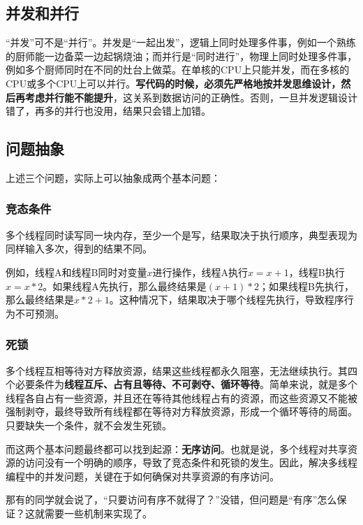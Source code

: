 \subsection{并发和并行}

“并发”可不是“并行”。并发是“一起出发”，逻辑上同时处理多件事，例如一个熟练的厨师能一边备菜一边起锅烧油；而并行是“同时进行”，物理上同时处理多件事，例如多个厨师同时在不同的灶台上做菜。在单核的CPU上只能并发，而在多核的CPU或多个CPU上可以并行。\textbf{写代码的时候，必须先严格地按并发思维设计，然后再考虑并行能不能提升}，这关系到数据访问的正确性。否则，一旦并发逻辑设计错了，再多的并行也没用，结果只会错上加错。

\subsection{问题抽象}

上述三个问题，实际上可以抽象成两个基本问题：

\subsubsection{竞态条件}

多个线程同时读写同一块内存，至少一个是写，结果取决于执行顺序，典型表现为同样输入多次，得到的结果不同。

例如，线程A和线程B同时对变量$x$进行操作，线程A执行$x = x + 1$，线程B执行$x = x * 2$。如果线程A先执行，那么最终结果是$(x + 1) * 2$；如果线程B先执行，那么最终结果是$x * 2 + 1$。这种情况下，结果取决于哪个线程先执行，导致程序行为不可预测。

\subsubsection{死锁}

多个线程互相等待对方释放资源，结果这些线程都永久阻塞，无法继续执行。其四个必要条件为\textbf{线程互斥、占有且等待、不可剥夺、循环等待}。简单来说，就是多个线程各自占有一些资源，并且还在等待其他线程占有的资源，而这些资源又不能被强制剥夺，最终导致所有线程都在等待对方释放资源，形成一个循环等待的局面。只要缺失一个条件，就不会发生死锁。

而这两个基本问题最终都可以找到起源：\textbf{无序访问}。也就是说，多个线程对共享资源的访问没有一个明确的顺序，导致了竞态条件和死锁的发生。因此，解决多线程编程中的并发问题，关键在于如何确保对共享资源的有序访问。

那有的同学就会说了，“只要访问有序不就得了？”没错，但问题是“有序”怎么保证？这就需要一些机制来实现了。

